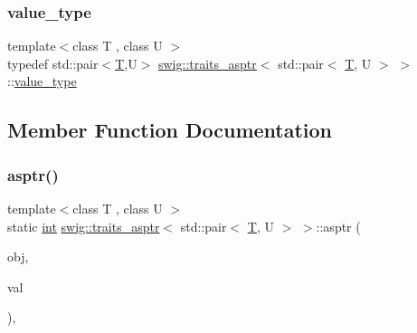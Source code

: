 \subsubsection{\texorpdfstring{value\+\_\+type}{value\_type}}
{\footnotesize\ttfamily template$<$class T , class U $>$ \\
typedef std\+::pair$<$\hyperlink{fmt_8h_a0acb682b8260ab1c60b918599864e2e5}{T},U$>$ \hyperlink{structswig_1_1traits__asptr}{swig\+::traits\+\_\+asptr}$<$ std\+::pair$<$ \hyperlink{fmt_8h_a0acb682b8260ab1c60b918599864e2e5}{T}, U $>$ $>$\+::\hyperlink{structswig_1_1traits__asptr_3_01std_1_1pair_3_01_t_00_01_u_01_4_01_4_a1cc2b1f24022176235ac0ede7646c041}{value\+\_\+type}}



\subsection{Member Function Documentation}
\mbox{\label{structswig_1_1traits__asptr_3_01std_1_1pair_3_01_t_00_01_u_01_4_01_4_a331a484c8263c370bd86a3a2d655614a}} 
\subsubsection{\texorpdfstring{asptr()}{asptr()}}
{\footnotesize\ttfamily template$<$class T , class U $>$ \\
static \hyperlink{lp__lib_8h_adeb9ec6400320e4923ac9d836d509ddb}{int} \hyperlink{structswig_1_1traits__asptr}{swig\+::traits\+\_\+asptr}$<$ std\+::pair$<$ \hyperlink{fmt_8h_a0acb682b8260ab1c60b918599864e2e5}{T}, U $>$ $>$\+::asptr (\begin{DoxyParamCaption}\item[{Py\+Object $\ast$}]{obj,  }\item[{std\+::pair$<$ \hyperlink{fmt_8h_a0acb682b8260ab1c60b918599864e2e5}{T}, U $>$ $\ast$$\ast$}]{val }\end{DoxyParamCaption})\hspace{0.3cm}{\ttfamily [inline]}, {\ttfamily [static]}}

\mbox{\label{structswig_1_1traits__asptr_3_01std_1_1pair_3_01_t_00_01_u_01_4_01_4_a7ba7929bef6f511c92ff9a847edf9bf0}} 

